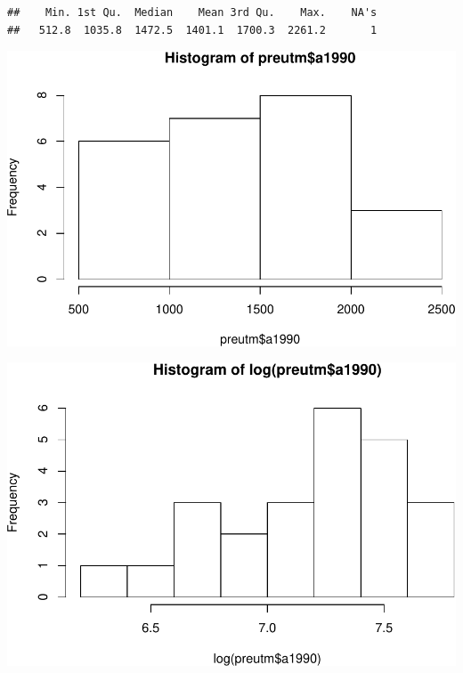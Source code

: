 \documentclass[11pt,]{article}
\newenvironment{Shaded}{\begin{snugshade}}{\end{snugshade}}
\newcommand{\KeywordTok}[1]{\textcolor[rgb]{0.13,0.29,0.53}{\textbf{#1}}}
\newcommand{\OperatorTok}[1]{\textcolor[rgb]{0.81,0.36,0.00}{\textbf{#1}}}
\newcommand{\NormalTok}[1]{#1}
\begin{document}
\begin{verbatim}
##    Min. 1st Qu.  Median    Mean 3rd Qu.    Max.    NA's 
##   512.8  1035.8  1472.5  1401.1  1700.3  2261.2       1
\end{verbatim}

\begin{Shaded}
\end{Shaded}

\includegraphics[width=600px]{Proyecto-Precipitaciones_files/figure-latex/esda-1990-1}

\begin{Shaded}
\end{Shaded}

\includegraphics[width=600px]{Proyecto-Precipitaciones_files/figure-latex/esda-1990-2}
\end{document}
